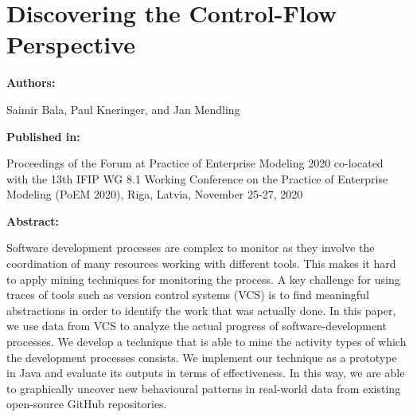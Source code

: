\chapter{Discovering the Control-Flow Perspective}
\label{chap:project-mining2}

{\bfseries \Large Authors: \medskip}

Saimir Bala,
Paul Kneringer, and
Jan Mendling \hfill

\bigskip

{\noindent\bfseries \Large Published in: \medskip}

Proceedings of the Forum at Practice of Enterprise Modeling 2020 co-located
with the 13th {IFIP} {WG} 8.1 Working Conference on the Practice of
Enterprise Modeling (PoEM 2020), Riga, Latvia, November 25-27, 2020

\bigskip

{\noindent\bfseries \Large Abstract: \medskip}


Software development processes are complex to monitor as they involve the coordination of many resources working with different tools.
This makes it hard to apply mining techniques for monitoring the process. 
A key challenge for using traces of tools such as version control systems (VCS) is to find meaningful abstractions in order to identify the work that was actually done. 
In this paper, we use data from VCS to analyze the actual progress of software-development processes. We develop a technique that is able to mine the activity types of which the development processes consists. 
We implement our technique as a prototype in Java and evaluate its outputs in terms of effectiveness.
In this way, we are able to graphically uncover new behavioural patterns in real-world data from existing open-source GitHub repositories.

\pagebreak


%

%





